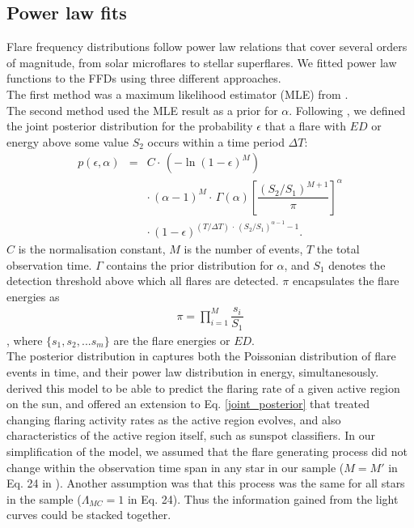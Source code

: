 \documentclass{aa}
\begin{document}
\subsection{Power law fits}
\label{powerlawfits}
Flare frequency distributions follow power law relations that cover several orders of magnitude, from solar microflares to stellar superflares. We fitted power law functions to the FFDs using three different approaches.
\\
The first method was a maximum likelihood estimator (MLE) from \citet{maschberger_powerlaw_2009}.
\\
The second method used the MLE result as a prior for $\alpha$. Following \citet{wheatland_flaresbayes_2004}, we defined the joint posterior distribution for the probability $\epsilon$ that a flare with $ED$ or energy above some value $S_2$ occurs within a time period $\Delta T$:
\begin{eqnarray}
\label{joint_posterior}
p(\epsilon, \alpha) &=& C \cdot\, (-\ln(1 - \epsilon)^{M})\nonumber\\
                    && \cdot\, (\alpha-1)^M \cdot\, \Gamma(\alpha) \left[\dfrac{(S_2 / S_1)^{M+1}}{\pi} \right]^{\alpha}\nonumber\\
                    && \cdot\, (1-\epsilon)^{(T / \Delta T) \,\cdot\, (S_2 /S_1)^{\alpha-1} -1 }.
\end{eqnarray}
$C$ is the normalisation constant, $M$ is the number of events, $T$ the total observation time. $\Gamma$ contains the prior distribution for $\alpha$, and $S_1$ denotes the detection threshold above which all flares are detected. $\pi$ encapsulates the flare energies as
\begin{eqnarray}
    \pi = \displaystyle \prod_{i=1}^M \dfrac{s_i}{S_1}
\end{eqnarray},
where $\{s_1,s_2,...s_m\}$ are the flare energies or $ED$.
\\
The posterior distribution in \citet{wheatland_flaresbayes_2004} captures both the Poissonian distribution of flare events in time, and their power law distribution in energy, simultanesously. \citet{wheatland_flaresbayes_2004} derived this model to be able to predict the flaring rate of a given active region on the sun, and offered an extension to Eq. \ref{joint_posterior} that treated changing flaring activity rates as the active region evolves, and also characteristics of the active region itself, such as sunspot classifiers. In our simplification of the model, we assumed that the flare generating process did not change within the observation time span in any star in our sample ($M=M'$ in Eq. 24 in \citet{wheatland_flaresbayes_2004}). Another assumption was that this process was the same for all stars in the sample ($\Lambda_{MC}=1$ in Eq. 24). Thus the information gained from the light curves could be stacked together.
\end{document}
